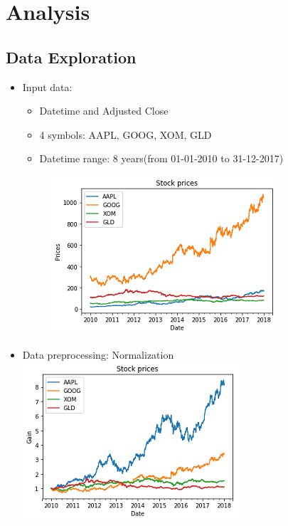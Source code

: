 \documentclass[11pt]{article}
\makeatletter
\def\maxwidth{\ifdim\Gin@nat@width>\linewidth\linewidth
    \else\Gin@nat@width\fi}
\let\Oldincludegraphics\includegraphics
\renewcommand{\includegraphics}[1]{\Oldincludegraphics[width=.8\maxwidth]{#1}}
\providecommand{\tightlist}{%
      \setlength{\itemsep}{0pt}\setlength{\parskip}{0pt}}
\makeatother
\begin{document}
\section{Analysis}\label{analysis}

\subsection{Data Exploration}\label{data-exploration}

\begin{itemize}
\item
  Input data:

  \begin{itemize}
  \tightlist
  \item
    Datetime and Adjusted Close
  \item
    4 symbols: AAPL, GOOG, XOM, GLD
  \item
    Datetime range: 8 years(from 01-01-2010 to 31-12-2017)
  \end{itemize}

  \begin{figure}
  \centering
  \includegraphics{./figures/2.jpg}
  \caption{}
  \end{figure}
\item
  Data preprocessing: Normalization \includegraphics{./figures/3.jpg}
\end{itemize}
\end{document}

